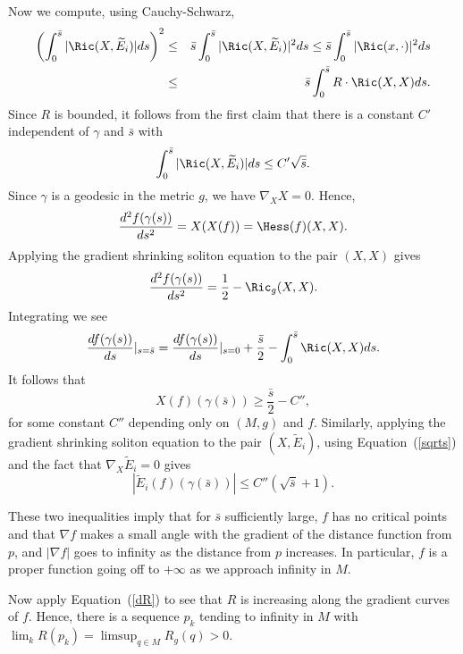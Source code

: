 Now we compute, using Cauchy-Schwarz,
\begin{eqnarray*}
\left(\int_0^{\bar s}|\Ric(X,\widetilde E_i)|ds\right)^2 & \le
&\bar s\int_0^{\bar s}|\Ric(X,\widetilde E_i)|^2ds\le \bar
s\int_0^{\bar s}|\Ric(x,\cdot)|^2ds\\ & \le &  \bar
s\int_0^{\bar s}R\cdot \Ric(X,X)ds.\end{eqnarray*} Since $R$ is
bounded, it follows from the first claim that there is a constant
$C'$ independent of $\gamma$ and $\bar s$ with
\begin{equation}\label{sqrts}
\int_0^{\bar s}|\Ric(X,\widetilde E_i)|ds\le C'\sqrt{\bar
s}.\end{equation} Since $\gamma$ is a geodesic in the metric $g$, we have
$\nabla_XX=0$. Hence,
$$\frac{d^2f(\gamma(s))}{ds^2}=X(X(f))=\Hess(f)(X,X).$$
Applying  the gradient shrinking soliton equation to the pair
$(X,X)$ gives
$$\frac{d^2f(\gamma(s))}{ds^2}=\frac{1}{2}-\Ric_{g}(X,X).$$
Integrating we see
$$\frac{df(\gamma(s))}{ds}|_{s=\bar
s}=\frac{df(\gamma(s))}{ds}|_{s=0}+\frac{\bar s}{2}-\int_0^{\bar
s}\Ric(X,X)ds.$$ It follows that
\begin{equation}\label{X}
X(f)(\gamma(\bar s))\ge \frac{\bar s}{2}-C'',\end{equation} for some
constant $C''$ depending only on $(M,g)$ and $f$. Similarly,
applying the gradient shrinking soliton equation to the pair
$(X,\widetilde E_i)$, using Equation~(\ref{sqrts}) and the fact that
$\nabla_X\widetilde E_i=0$ gives
\begin{equation}\label{sqrts2}
|\widetilde E_i(f)(\gamma(\bar s))|\le C''(\sqrt{\bar
s}+1).\end{equation}

These two inequalities imply that for $\bar s$ sufficiently large,
$f$ has no critical points  and that $\nabla f$ makes a small angle
with the gradient of the distance function from $p$, and $|\nabla
f|$ goes to infinity as the distance from $p$ increases. In
particular, $f$ is a proper function going off to $+\infty$ as we
approach infinity in $M$.

Now apply Equation~(\ref{dR}) to see that $R$ is increasing along the gradient
curves of $f$. Hence, there is a sequence $p_k$ tending to infinity in $M$ with
$\lim_kR(p_k)=\limsup_{q\in M} R_g(q)>0$.


